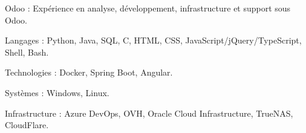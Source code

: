 \begin{indentsection}{\parindent}
  \begin{description*}
    \item[Odoo :] Expérience en analyse, développement, infrastructure et support sous Odoo.
    \item[Langages :] Python, Java, SQL, C, HTML, CSS, JavaScript/jQuery/TypeScript, Shell, Bash.
    \item[Technologies :] Docker, Spring Boot, Angular.
    \item[Systèmes :] Windows, Linux.
    \item[Infrastructure :] Azure DevOps, OVH, Oracle Cloud Infrastructure, TrueNAS, CloudFlare.

  \end{description*}
\end{indentsection}
